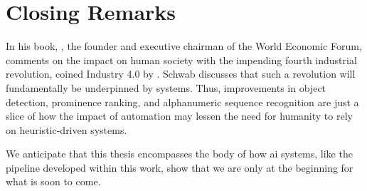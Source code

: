 \section{Closing Remarks}

In his \citeyear{Schwab:2017vd} book, \citet{Schwab:2017vd}, the founder and executive chairman of the World Economic Forum, comments on the impact on human society with the impending fourth industrial revolution, coined Industry 4.0 by \citet{kagermann2011industrie}. Schwab discusses that such a revolution will fundamentally be underpinned by  systems. Thus, improvements in object detection, prominence ranking, and alphanumeric sequence recognition are just a slice of how the impact of automation may lessen the need for humanity to rely on heuristic-driven systems.

\bigskip
\noindent
We anticipate that this thesis encompasses the body of how \gls{ai} systems, like the pipeline developed within this work, show that we are only at the beginning for what is soon to come.